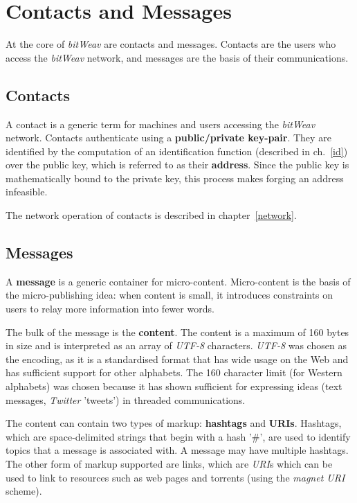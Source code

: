 \documentclass[10pt,a4paper,onecolumn]{article}
\begin{document}
\section{Contacts and Messages}
\label{ContactsAndMessages}
At the core of \textit{bitWeav} are contacts and messages. Contacts are the users who access the \textit{bitWeav} network, and messages are the basis of their communications.

\subsection*{Contacts}
A contact is a generic term for machines and users accessing the \textit{bitWeav} network. Contacts authenticate using a \textbf{public/private key-pair}. They are identified by the computation of an identification function (described in ch.~\ref{id}) over the public key, which is referred to as their \textbf{address}. Since the public key is mathematically bound to the private key, this process makes forging an address infeasible.

The network operation of contacts is described in chapter~\ref{network}.

\subsection*{Messages}
A \textbf{message} is a generic container for micro-content. Micro-content is the basis of the micro-publishing idea: when content is small, it introduces constraints on users to relay more information into fewer words.

The bulk of the message is the \textbf{content}. The content is a maximum of 160 bytes in size and is interpreted as an array of \textit{UTF-8} characters. \textit{UTF-8} was chosen as the encoding, as it is a standardised format that has wide usage on the Web and has sufficient support for other alphabets. The 160 character limit (for Western alphabets) was chosen because it has shown sufficient for expressing ideas (text messages, \textit{Twitter} 'tweets') in threaded communications. 

The content can contain two types of markup: \textbf{hashtags} and \textbf{URIs}. Hashtags, which are space-delimited strings that begin with a hash '\#', are used to identify topics that a message is associated with. A message may have multiple hashtags. The other form of markup supported are links, which are \textit{URI}s which can be used to link to resources such as web pages and torrents (using the \textit{magnet URI} scheme).
\end{document}

